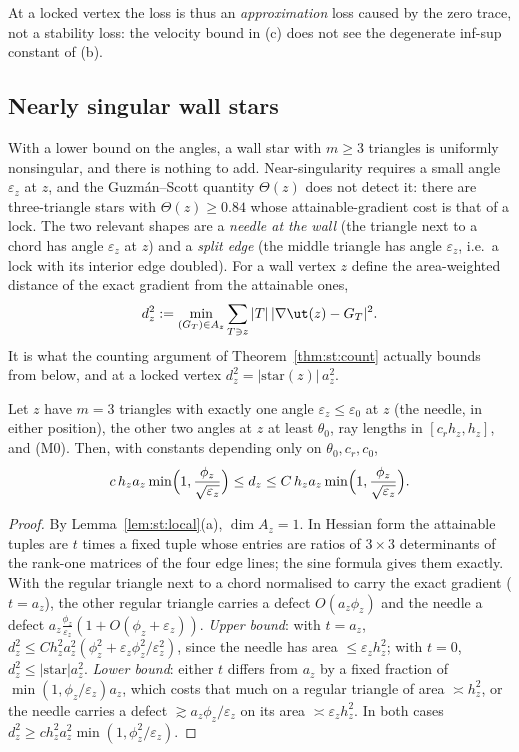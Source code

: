 At a locked vertex the loss is thus an \emph{approximation} loss caused by the zero trace, not a stability loss: the velocity bound in (c) does not see the degenerate inf-sup constant of (b).

\subsection{Nearly singular wall stars}
With a lower bound on the angles, a wall star with $m\ge3$ triangles is uniformly nonsingular, and there is nothing to add. Near-singularity requires a small angle $\varepsilon_z$ at $z$, and the Guzm\'an--Scott quantity $\Theta(z)$ does not detect it: there are three-triangle stars with $\Theta(z)\ge0.84$ whose attainable-gradient cost is that of a lock. The two relevant shapes are a \emph{needle at the wall} (the triangle next to a chord has angle $\varepsilon_z$ at $z$) and a \emph{split edge} (the middle triangle has angle $\varepsilon_z$, i.e.\ a lock with its interior edge doubled). For a wall vertex $z$ define the area-weighted distance of the exact gradient from the attainable ones,
\[
d_z^2:=\min_{(G_T)\in A_z}\sum_{T\ni z}|T|\,|\nabla\ut(z)-G_T|^2 .
\]
It is what the counting argument of Theorem~\ref{thm:st:count} actually bounds from below, and at a locked vertex $d_z^2=|\text{star}(z)|\,a_z^2$.

\begin{theorem}\label{thm:st:needle}
Let $z$ have $m=3$ triangles with exactly one angle $\varepsilon_z\le\varepsilon_0$ at $z$ (the needle, in either position), the other two angles at $z$ at least $\theta_0$, ray lengths in $[c_rh_z,h_z]$, and (M0). Then, with constants depending only on $\theta_0,c_r,c_0$,
\[
c\,h_za_z\min\Bigl(1,\frac{\phi_z}{\sqrt{\varepsilon_z}}\Bigr)\le d_z\le C\,h_za_z\min\Bigl(1,\frac{\phi_z}{\sqrt{\varepsilon_z}}\Bigr).
\]
\end{theorem}

\begin{proof}
By Lemma~\ref{lem:st:local}(a), $\dim A_z=1$. In Hessian form the attainable tuples are $t$ times a fixed tuple whose entries are ratios of $3\times3$ determinants of the rank-one matrices of the four edge lines; the sine formula gives them exactly. With the regular triangle next to a chord normalised to carry the exact gradient ($t=a_z$), the other regular triangle carries a defect $O(a_z\phi_z)$ and the needle a defect $a_z\frac{\phi_z}{\varepsilon_z}(1+O(\phi_z+\varepsilon_z))$. \emph{Upper bound}: with $t=a_z$, $d_z^2\le Ch_z^2a_z^2(\phi_z^2+\varepsilon_z\phi_z^2/\varepsilon_z^2)$, since the needle has area $\le\varepsilon_zh_z^2$; with $t=0$, $d_z^2\le|\text{star}|a_z^2$. \emph{Lower bound}: either $t$ differs from $a_z$ by a fixed fraction of $\min(1,\phi_z/\varepsilon_z)a_z$, which costs that much on a regular triangle of area $\asymp h_z^2$, or the needle carries a defect $\gtrsim a_z\phi_z/\varepsilon_z$ on its area $\asymp\varepsilon_zh_z^2$. In both cases $d_z^2\ge ch_z^2a_z^2\min(1,\phi_z^2/\varepsilon_z)$.
\end{proof}

